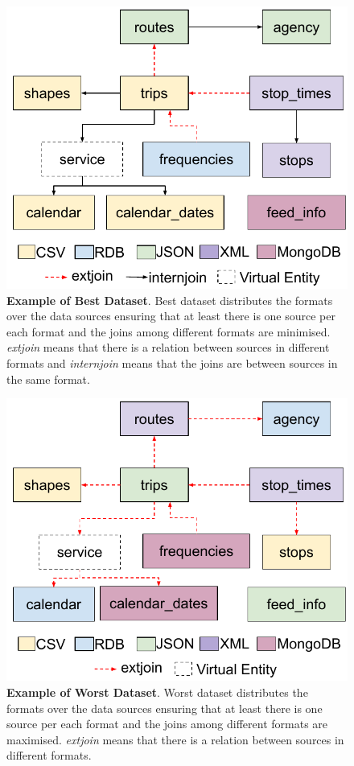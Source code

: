 \begin{figure}[h]
    \centering
    \includegraphics[width=0.85\linewidth]{figures/best-dist.pdf}
    \caption[Example of best dataset]{\textbf{Example of Best Dataset}. Best dataset distributes the formats over the data sources ensuring that at least there is one source per each format and the joins among different formats are minimised. \textit{extjoin} means that there is a relation between sources in different formats and \textit{internjoin} means that the joins are between sources in the same format.}
    \label{fig:best}
\end{figure}


\begin{figure}[h]
    \centering
    \includegraphics[width=0.85\linewidth]{figures/worst-dist.pdf}
    \caption[Example of worst dataset]{\textbf{Example of Worst Dataset}. Worst dataset distributes the formats over the data sources ensuring that at least there is one source per each format and the joins among different formats are maximised. \textit{extjoin} means that there is a relation between sources in different formats.}
    \label{fig:worst}
\end{figure}

